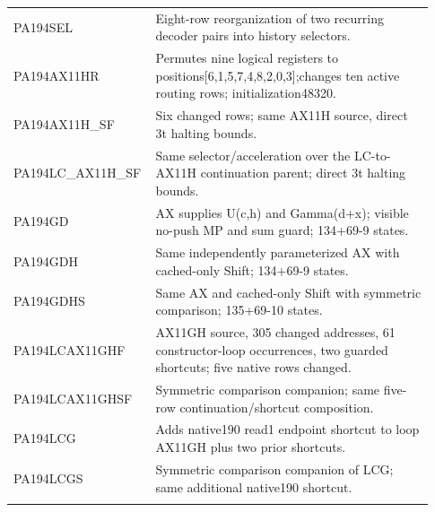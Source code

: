 \begin{longtable}{>{\raggedright\arraybackslash}p{0.28\linewidth}>{\raggedright\arraybackslash}p{0.65\linewidth}}
PA194SEL & Eight-row reorganization of two recurring decoder pairs into history selectors.\\\addlinespace[4pt]
PA194AX11HR & Permutes nine logical registers to positions[6,1,5,7,4,8,2,0,3];changes ten active routing rows; initialization48320.\\\addlinespace[4pt]
PA194AX11H\_SF & Six changed rows; same AX11H source, direct 3t halting bounds.\\\addlinespace[4pt]
PA194LC\_AX11H\_SF & Same selector/\allowbreak{}acceleration over the LC-to-AX11H continuation parent; direct 3t halting bounds.\\\addlinespace[4pt]
PA194GD & AX supplies U(c,h) and Gamma(d+x); visible no-push MP and sum guard; 134+69-9 states.\\\addlinespace[4pt]
PA194GDH & Same independently parameterized AX with cached-only Shift; 134+69-9 states.\\\addlinespace[4pt]
PA194GDHS & Same AX and cached-only Shift with symmetric comparison; 135+69-10 states.\\\addlinespace[4pt]
PA194LCAX11GHF & AX11GH source, 305 changed addresses, 61 constructor-loop occurrences, two guarded shortcuts; five native rows changed.\\\addlinespace[4pt]
PA194LCAX11GHSF & Symmetric comparison companion; same five-row continuation/\allowbreak{}shortcut composition.\\\addlinespace[4pt]
PA194LCG & Adds native190 read1 endpoint shortcut to loop AX11GH plus two prior shortcuts.\\\addlinespace[4pt]
PA194LCGS & Symmetric comparison companion of LCG; same additional native190 shortcut.\\\addlinespace[4pt]
\end{longtable}
\endgroup
